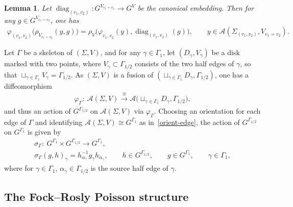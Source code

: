 \documentclass[pdftex]{sigma}
\numberwithin{equation}{section}
\newtheorem{Lemma}[Theorem]{Lemma}
\def \A {{\mathcal{A}}}
\DeclareMathOperator{\diag}{diag}
\def \sV {{\scriptscriptstyle V}}
\def \sGam {{\scriptscriptstyle \Gamma}}
\newcommand{\calpha}{\check{\alpha}}
\begin{document}
\begin{Lemma} \label{big-action}
Let $\diag_{(v_1, v_2)}\colon G^{V_{v_1=v_2}} \to G^V$ be the canonical embedding. Then for any $g \in G^{V_{v_1= v_2}}$, one has
\begin{gather*}
\varphi_{(v_1, v_2)}\big(\rho_{\sV_{v_1=v_2}}(y, g)\big) = \rho_{\sV} \big( \varphi_{v_1, v_2}(y), \diag_{(v_1, v_2)}(g) \big), \qquad y \in \A(\Sigma_{(v_1, v_2)}, V_{v_1= v_2}).
\end{gather*}
\end{Lemma}


Let $\Gamma$ be a skeleton of $(\Sigma, V)$, and for any $\gamma \in \Gamma_1$, let $(D_\gamma, V_\gamma)$ be a disk marked with two points, where $V_\gamma \subset \Gamma_{1/2}$ consists of the two half edges of $\gamma$, so that $\sqcup_{\gamma \in \Gamma_1} V_\gamma= \Gamma_{1/2}$. As $(\Sigma, V)$ is a fusion of $(\sqcup_{\gamma \in \Gamma_1} D_\gamma, \Gamma_{1/2})$, one has a dif\/feomorphism
\begin{gather*}
\varphi_{\sGam}\colon \ \A(\Sigma, V) \stackrel{\cong}{\longrightarrow} \A\big(\sqcup_{\gamma \in \Gamma_1} D_\gamma, \Gamma_{1/2}\big),
\end{gather*}
and thus an action of $G^{\Gamma_{1/2}}$ on $\A(\Sigma, V)$ via $\varphi_{\sGam}$. Choosing an orientation for each edge of $\Gamma$ and identifying $\A(\Sigma, V) \cong G^{\Gamma_1}$ as in~\eqref{orient-edge}, the action of $G^{\Gamma_{1/2}}$ on $G^{\Gamma_1}$ is given by
\begin{gather}
\sigma_{\sGam}\colon \ G^{\Gamma_1} \times G^{\Gamma_{1/2}} \to G^{\Gamma_1}, \nonumber\\
\sigma_{\sGam}(g, h)_\gamma = h_{\alpha_\gamma}^{-1} g_\gamma h_{\calpha_\gamma}, \qquad h \in G^{\Gamma_{1/2}}, \qquad g \in G^{\Gamma_1}, \qquad \gamma \in \Gamma_1, \label{sigma}
\end{gather}
where for $\gamma \in \Gamma_1$, $\alpha_\gamma \in \Gamma_{1/2}$ is the source half edge of $\gamma$.

\subsection{The Fock--Rosly Poisson structure} \label{subsec-FR}
\end{document}
